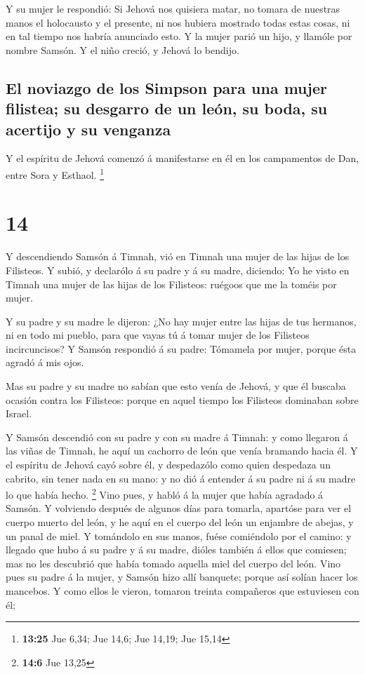  Y su mujer le respondió: Si Jehová nos quisiera matar,
no tomara de nuestras manos el holocausto y el presente, ni nos hubiera
mostrado todas estas cosas, ni en tal tiempo nos habría anunciado esto.
 Y la mujer parió un hijo, y llamóle por nombre Samsón. Y
el niño creció, y Jehová lo bendijo.

\hypertarget{el-noviazgo-de-los-simpson-para-una-mujer-filistea-su-desgarro-de-un-leuxf3n-su-boda-su-acertijo-y-su-venganza}{%
\subsection{El noviazgo de los Simpson para una mujer filistea; su
desgarro de un león, su boda, su acertijo y su
venganza}\label{el-noviazgo-de-los-simpson-para-una-mujer-filistea-su-desgarro-de-un-leuxf3n-su-boda-su-acertijo-y-su-venganza}}

 Y el espíritu de Jehová comenzó á manifestarse en él en
los campamentos de Dan, entre Sora y Esthaol. \footnote{\textbf{13:25}
  Jue 6,34; Jue 14,6; Jue 14,19; Jue 15,14}

\hypertarget{section-13}{%
\section{14}\label{section-13}}

 Y descendiendo Samsón á Timnah, vió en Timnah una mujer
de las hijas de los Filisteos.  Y subió, y declarólo á su
padre y á su madre, diciendo: Yo he visto en Timnah una mujer de las
hijas de los Filisteos: ruégoos que me la toméis por mujer.

 Y su padre y su madre le dijeron: ¿No hay mujer entre las
hijas de tus hermanos, ni en todo mi pueblo, para que vayas tú á tomar
mujer de los Filisteos incircuncisos? Y Samsón respondió á su padre:
Tómamela por mujer, porque ésta agradó á mis ojos.

 Mas su padre y su madre no sabían que esto venía de
Jehová, y que él buscaba ocasión contra los Filisteos: porque en aquel
tiempo los Filisteos dominaban sobre Israel.

 Y Samsón descendió con su padre y con su madre á Timnah:
y como llegaron á las viñas de Timnah, he aquí un cachorro de león que
venía bramando hacia él.  Y el espíritu de Jehová cayó
sobre él, y despedazólo como quien despedaza un cabrito, sin tener nada
en su mano: y no dió á entender á su padre ni á su madre lo que había
hecho. \footnote{\textbf{14:6} Jue 13,25}  Vino pues, y
habló á la mujer que había agradado á Samsón.  Y volviendo
después de algunos días para tomarla, apartóse para ver el cuerpo muerto
del león, y he aquí en el cuerpo del león un enjambre de abejas, y un
panal de miel.  Y tomándolo en sus manos, fuése comiéndolo
por el camino: y llegado que hubo á su padre y á su madre, dióles
también á ellos que comiesen; mas no les descubrió que había tomado
aquella miel del cuerpo del león.  Vino pues su padre á
la mujer, y Samsón hizo allí banquete; porque así solían hacer los
mancebos.  Y como ellos le vieron, tomaron treinta
compañeros que estuviesen con él;

